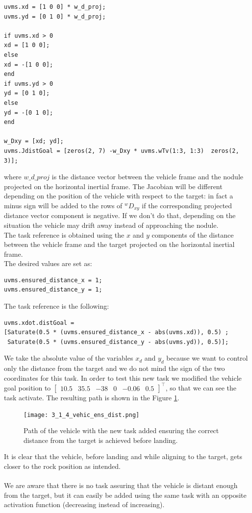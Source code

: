 \documentclass{article}
\begin{document}
\begin{lstlisting}
uvms.xd = [1 0 0] * w_d_proj;
uvms.yd = [0 1 0] * w_d_proj;

if uvms.xd > 0
xd = [1 0 0];
else
xd = -[1 0 0];
end
if uvms.yd > 0
yd = [0 1 0];
else
yd = -[0 1 0];
end

w_Dxy = [xd; yd];
uvms.JdistGoal = [zeros(2, 7) -w_Dxy * uvms.wTv(1:3, 1:3)  zeros(2, 3)];
\end{lstlisting}
where $ w\_d\_proj $ is the distance vector between the vehicle frame and the nodule projected on the horizontal inertial frame.
The Jacobian will be different depending on the position of the vehicle with respect to the target: in fact a minus sign will be added to the rows of \(^wD_{xy}\) if the corresponding projected distance vector component is negative. If we don't do that, depending on the situation the vehicle may drift away instead of approaching the nodule.\\
The task reference is obtained using the \(x\) and \(y\) components of the distance between the vehicle frame and the target projected on the horizontal inertial frame.\\
The desired values are set as: 
\begin{lstlisting}
uvms.ensured_distance_x = 1;
uvms.ensured_distance_y = 1;
\end{lstlisting}
The task reference is the following: 
\begin{lstlisting}
uvms.xdot.distGoal = 
[Saturate(0.5 * (uvms.ensured_distance_x - abs(uvms.xd)), 0.5) ;
 Saturate(0.5 * (uvms.ensured_distance_y - abs(uvms.yd)), 0.5)];
\end{lstlisting}
We take the absolute value of the variables \(x_d\) and \(y_d\) because we want to control only the distance from the target and we do not mind the sign of the two coordinates for this task.
In order to test this new task we modified the vehicle goal position to \(\begin{bmatrix} 10.5 & 35.5 & -38 & 0 & -0.06 & 0.5 \end{bmatrix}^\top\), so that we can see the task activate. The resulting path is shown in the Figure \ref{im:v_land_ens_dist}.
\begin{figure}[H]
	\centering
	{\texttt{[image: 3\_1\_4\_vehic\_ens\_dist.png]}}
	\caption{Path of the vehicle with the new task added ensuring the correct distance from the target is achieved before landing. }
	\label{im:v_land_ens_dist}
\end{figure} 
It is clear that the vehicle, before landing and while aligning to the target, gets closer to the rock position as intended.\\\\
We are aware that there is no task assuring that the vehicle is distant enough from the target, but it can easily be added using the same task with an opposite activation function (decreasing instead of increasing). 
\clearpage
\end{document}
